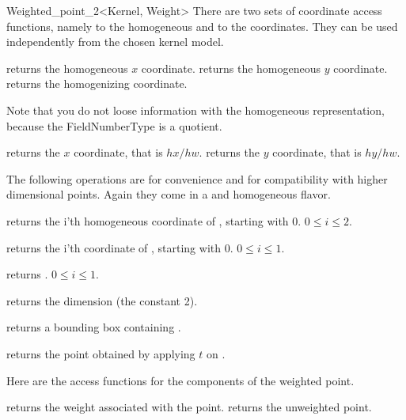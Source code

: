 \begin{ccRefClass} {Weighted_point_2<Kernel, Weight>}
There are two sets of coordinate access functions, namely to the
homogeneous and to the  coordinates. They can be used
independently from the chosen kernel model.

       {returns the homogeneous $x$ coordinate.}
\ccGlue
{}
       {returns the homogeneous $y$ coordinate.}
\ccGlue
{}
       {returns the homogenizing  coordinate.}

Note that you do not loose information with the homogeneous
representation, because the FieldNumberType is a quotient.

    {returns the  $x$ coordinate, that is $hx/hw$.}
\ccGlue
{}
    {returns the  $y$ coordinate, that is $hy/hw$.}

The following operations are for convenience and for compatibility
with higher dimensional points.  Again they come in a
 and homogeneous flavor.

       {returns the i'th homogeneous coordinate of \ccVar, starting with 0.
        \ccPrecond $0\leq i \leq 2$.}

       {returns the i'th  coordinate of \ccVar, 
        starting with 0.
        \ccPrecond $0\leq i \leq 1$.}

       {returns .
        \ccPrecond $0\leq i \leq 1$.}

       {returns the dimension (the constant 2).}

       {returns a bounding box containing \ccVar.}

       {returns the point obtained by applying $t$ on \ccVar.}

Here are the access functions for the components of the weighted point.

       {returns the weight associated with the point.}
\ccGlue
{}
       {returns the unweighted point.}




\end{ccRefClass}
